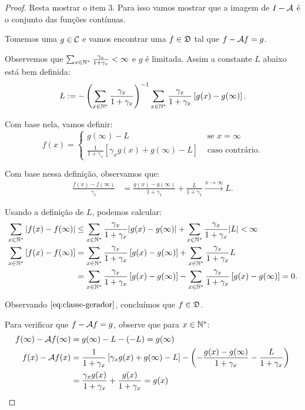 \begin{proof}
  Resta mostrar o item 3. Para isso vamos mostrar que a imagem de $I -
  {\mathcal{A}}$ é o conjunto das funções contínuas.

  Tomemos uma $g \in {\mathcal{C}}$ e vamos encontrar uma $f \in {\mathfrak{D}}$ tal que
  $f - {\mathcal{A}} f = g$.

  Observemos que $\sum_{x \in {\mathbb{N^*}}} \frac{\gamma_x}{1+\gamma_x} <
  \infty$ e $g$ é limitada. Assim a constante $L$ abaixo está bem
  definida:
  \begin{displaymath}
    L := -\left( \sum_{x \in {\mathbb{N^*}}} \frac{\gamma_x}{1+\gamma_x} \right)^{-1}
    \sum_{x \in {\mathbb{N^*}}} \frac{\gamma_x}{1 +
      \gamma_x} \left[ g(x) - g(\infty) \right].
  \end{displaymath}

  Com base nela, vamos definir:
  \begin{equation*}
    f(x) = \begin{cases}
      g(\infty) - L & \textrm{ se } x = \infty\\
      \frac{1}{1+\gamma_x} \left[
        \gamma_x g(x) + g(\infty) - L
      \right] & \textrm{ caso contrário.}
    \end{cases}
  \end{equation*}

  Com base nessa definição, observamos que:
  \begin{align*}
    \frac{f(x) - f(\infty)}{\gamma_x} &=
    \frac{g(x) - g(\infty) }{1+\gamma_x} +
    \frac{L}{1+\gamma_x} \xrightarrow{x \to \infty} L.
  \end{align*}

  Usando a definição de $L$, podemos calcular:
  \begin{align*}
    \sum_{x \in {\mathbb{N^*}}} \left|f(x) - f(\infty)\right|
    &\leq \sum_{x\in{\mathbb{N^*}}} \frac{\gamma_x}{1+\gamma_x} |g(x) -
    g(\infty)|
    + \sum_{x\in{\mathbb{N^*}}} \frac{\gamma_x}{1+\gamma_x} |L| < \infty\\
    \sum_{x \in {\mathbb{N^*}}} \left[f(x) - f(\infty)\right]
    &= \sum_{x\in{\mathbb{N^*}}} \frac{\gamma_x}{1+\gamma_x} \left[g(x) -
    g(\infty)\right]
    + \sum_{x\in{\mathbb{N^*}}} \frac{\gamma_x}{1+\gamma_x} L\\
    &= \sum_{x\in{\mathbb{N^*}}} \frac{\gamma_x}{1+\gamma_x} \left[g(x) -
    g(\infty)\right]
  - \sum_{x\in{\mathbb{N^*}}} \frac{\gamma_x}{1+\gamma_x} \left[g(x) -
    g(\infty)\right] = 0.
  \end{align*}

  Observando $\eqref{eq:classe-gerador}$, concluímos que $f \in
  {\mathfrak{D}}$.

  Para verificar que $f - {\mathcal{A}} f = g$, observe que para $x \in {\mathbb{N^*}}$:
  \begin{align*}
    f(\infty) - {\mathcal{A}} f (\infty) &=
    g(\infty) - L - (-L) = g(\infty) \\
    f(x) - {\mathcal{A}} f (x) &=
    \frac{1}{1+\gamma_x} \left[
      \gamma_x g(x) + g(\infty) - L
    \right] - \left(
      - \frac{g(x) - g(\infty) }{1+\gamma_x} -
      \frac{L}{1+\gamma_x}
    \right)\\
    &=
   \frac{\gamma_x g(x)}{1+\gamma_x}
    + \frac{g(x)}{1+\gamma_x} = g(x)
    \qedhere
  \end{align*}
\end{proof}



